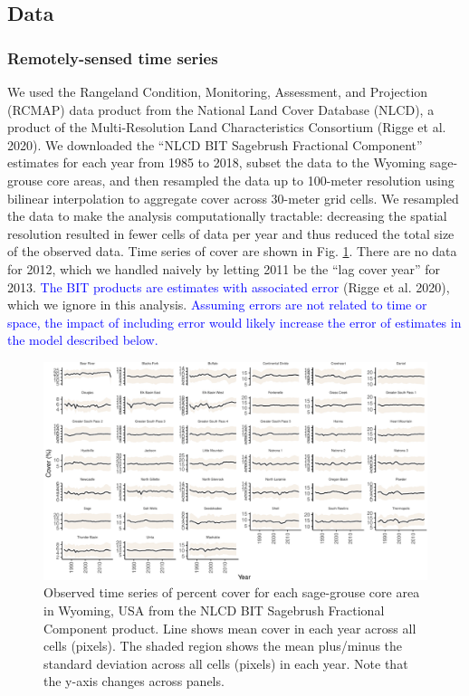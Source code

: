 \documentclass[
  12pt,
]{article}
\begin{document}
\hypertarget{data}{%
\subsection{Data}\label{data}}

\hypertarget{remotely-sensed-time-series}{%
\subsubsection{Remotely-sensed time series}\label{remotely-sensed-time-series}}

We used the Rangeland Condition, Monitoring, Assessment, and Projection (RCMAP) data product from the National Land Cover Database (NLCD), a product of the Multi-Resolution Land Characteristics Consortium (Rigge et al. 2020).
We downloaded the ``NLCD BIT Sagebrush Fractional Component'' estimates for each year from 1985 to 2018, subset the data to the Wyoming sage-grouse core areas, and then resampled the data up to 100-meter resolution using bilinear interpolation to aggregate cover across 30-meter grid cells.
We resampled the data to make the analysis computationally tractable: decreasing the spatial resolution resulted in fewer cells of data per year and thus reduced the total size of the observed data.
Time series of cover are shown in Fig. \ref{fig:data}.
There are no data for 2012, which we handled naively by letting 2011 be the ``lag cover year'' for 2013.
\textcolor{blue}{The BIT products are estimates with associated error} (Rigge et al. 2020), which we ignore in this analysis.
\textcolor{blue}{Assuming errors are not related to time or space, the impact of including error would likely increase the error of estimates in the model described below.}

\begin{figure}
\centering
\includegraphics{sageCastManuscript_files/figure-latex/data-1.pdf}
\caption{\label{fig:data}Observed time series of percent cover for each sage-grouse core area in Wyoming, USA from the NLCD BIT Sagebrush Fractional Component product. Line shows mean cover in each year across all cells (pixels). The shaded region shows the mean plus/minus the standard deviation across all cells (pixels) in each year. Note that the y-axis changes across panels.}
\end{figure}
\end{document}
